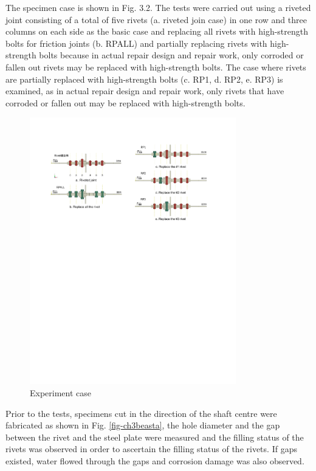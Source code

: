 The specimen case is shown in Fig. 3.2. The tests were carried out using a riveted joint consisting of a total of five rivets (a. riveted join case) in one row and three columns on each side as the basic case and replacing all rivets with high-strength bolts for friction joints (b. RPALL) and partially replacing rivets with high-strength bolts because in actual repair design and repair work, only corroded or fallen out rivets may be replaced with high-strength bolts. The case where rivets are partially replaced with high-strength bolts (c. RP1, d. RP2, e. RP3) is examined, as in actual repair design and repair work, only rivets that have corroded or fallen out may be replaced with high-strength bolts.

\begin{figure}[htbp]
    \centering
    \includegraphics[width=0.8\textwidth]{imgs/ch3/riveexpcase.pdf}
    \caption{Experiment case}
    \label{fig:enter-label}
\end{figure}

Prior to the tests, specimens cut in the direction of the shaft centre were fabricated as shown in Fig. \ref{fig-ch3beasta}, the hole diameter and the gap between the rivet and the steel plate were measured and the filling status of the rivets was observed in order to ascertain the filling status of the rivets. If gaps existed, water flowed through the gaps and corrosion damage was also observed.

